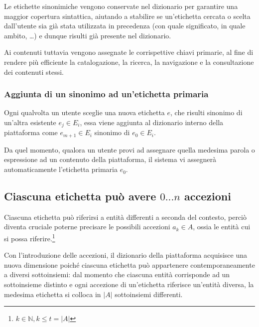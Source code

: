 \documentclass[10pt,a4paper,headinclude,footinclude,hidelinks]{scrreprt} %
\begin{document}
	Le etichette sinonimiche vengono conservate nel dizionario per garantire una maggior copertura sintattica, aiutando a stabilire se un'etichetta cercata o scelta dall'utente sia già stata utilizzata in precedenza (con quale significato, in quale ambito, \ldots) e dunque risulti già presente nel dizionario.

	Ai contenuti tuttavia vengono assegnate le corrispettive chiavi primarie, al fine di rendere più efficiente la catalogazione, la ricerca, la navigazione e la consultazione dei contenuti stessi.

	\subsubsection{Aggiunta di un sinonimo ad un'etichetta primaria}
	Ogni qualvolta un utente sceglie una nuova etichetta $e$, che risulti sinonimo di un'altra esistente $e_j \in E_i$, essa viene aggiunta al dizionario interno della piattaforma come $e_{m+1} \in E_i$ sinonimo di $e_0 \in E_i$.

	Da quel momento, qualora un utente provi ad assegnare quella medesima parola o espressione ad un contenuto della piattaforma, il sistema vi assegnerà automaticamente l'etichetta primaria $e_0$.

	\subsection[Accezioni]{Ciascuna etichetta può avere $0...n$ accezioni}
	Ciascuna etichetta può riferirsi a entità differenti a seconda del contesto, perciò diventa cruciale poterne precisare le possibili accezioni $a_k \in A$, ossia le entità cui si possa riferire.\footnote{$k \in \mathbb{N}, k \leq t=\left|A\right|$}
	
	Con l'introduzione delle accezioni, il dizionario della piattaforma acquisisce una nuova dimensione poiché ciascuna etichetta può appartenere contemporaneamente a diversi sottoinsiemi: dal momento che ciascuna entità corrisponde ad un sottoinsieme distinto e ogni accezione di un'etichetta riferisce un'entità diversa, la medesima etichetta si colloca in $\left|A\right|$ sottoinsiemi differenti.
\end{document}
